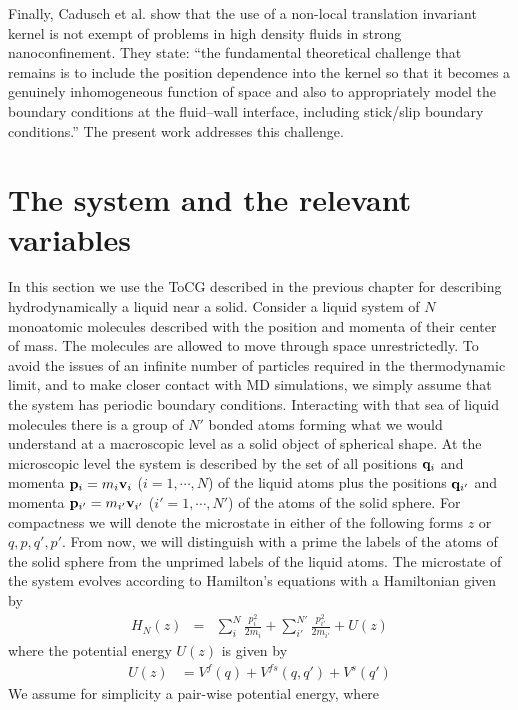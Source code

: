 \documentclass[b5paper,openright,11pt]{book}
\begin{document}
Finally, Cadusch et al.  \cite{Cadusch2008}  show   that  the  use  of  a
non-local translation invariant kernel is not exempt  of problems in high
density fluids in strong nanoconfinement. They state: ``the fundamental
theoretical  challenge  that  remains   is  to  include  the  position
dependence  into   the  kernel   so  that   it  becomes   a  genuinely
inhomogeneous function  of space and  also to appropriately  model the
boundary conditions at the  fluid–wall interface, including stick/slip
boundary conditions.'' The present work addresses this challenge.


\section{The system and the relevant variables}
In this section we use the ToCG described in the previous chapter for describing hydrodynamically a liquid near a solid. 
Consider a liquid system of $N$ monoatomic molecules described
with the position and momenta of  their center of mass.  The molecules
are allowed to move through  space unrestrictedly. To avoid the issues
of  an infinite  number  of particles  required  in the  thermodynamic
limit, and to make closer contact with MD simulations,
we simply  assume that  the system  has periodic  boundary conditions.
Interacting with that sea of liquid molecules there is a group of $N'$
bonded atoms forming  what we would understand at a macroscopic level
as a solid object of spherical shape. 
At the microscopic level the system is described  by the set of all  positions  ${\bf  q}_i$  and  momenta  ${\bf  p}_i=m_i{\bf  v}_i$
($i=1,\cdots,N$) of the liquid atoms plus the positions ${\bf q}_{i'}$
and  momenta ${\bf  p}_{i'}=m_{i'}{\bf v}_{i'}$  ($i'=1,\cdots,N'$) of
the atoms  of the solid  sphere.  For  compactness we will  denote the
microstate in either  of the following forms $z$  or ${q,p,q',p'}$. From now, we
will distinguish  with a prime  the labels of  the atoms of  the solid
sphere from the  unprimed labels of the liquid  atoms.  The microstate
of  the  system  evolves  according to  Hamilton's  equations  with  a
Hamiltonian given by
\begin{eqnarray}
H_N(z) &=& \sum^N_i \frac{p_i^2}{2m_i} + \sum^{N'}_{i'} \frac{p_{i'}^2}{2m_{i'}}
+ U(z)
\label{H}
\end{eqnarray}
where the potential energy $U(z)$ is given by
\begin{align}
U(z)&=  V^{f}(q)+ V^{fs}(q,q')+ V^{s}(q')
\end{align}
We  assume   for  simplicity  a  pair-wise   potential  energy,  where
\end{document}
